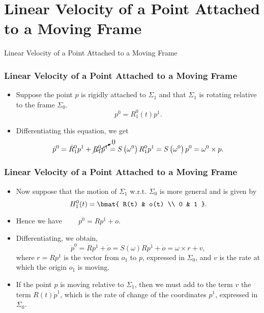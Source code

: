 \section{Linear Velocity of a Point Attached to a Moving Frame}

\begin{frame}
    Linear Velocity of a Point Attached to a Moving Frame


\end{frame}

\begingroup
\small

\begin{frame}
    \frametitle{Linear Velocity of a Point Attached to a Moving Frame}

    \begin{itemize}
        \item Suppose the point $p$ is rigidly attached to $\Sigma_1$ and that 
        $\Sigma_1$ is rotating relative to the frame $\Sigma_0$.
        \[ p^0 = R_1^0(t)p^1. \]
        \item Differentiating this equation, we get 
        \[ \dot{p}^0 = \dot{R}_1^0 p^1 + \cancelto{0}{R_1^0 \dot{p}^1} =
        S\left( \omega^0 \right) R_1^0p^1 = S\left( \omega^0 \right) p^0 =
        \omega^0 \times p. \]
    \end{itemize}
\end{frame}


\begin{frame}
    \frametitle{Linear Velocity of a Point Attached to a Moving Frame}

    \begin{itemize}
        \item Now suppose that the motion of $\Sigma_1$ w.r.t. $\Sigma_0$ is
        more general and is given by \[ H_1^0(t) = \bmat{
            R(t) & o(t) \\ 0 & 1
        }. \]
        \item Hence we have $\qquad p^0 = Rp^1 + o$.
        \item Differentiating, we obtain,
        \[ \dot{p}^0 = \dot{R}p^1 + \dot{o} = S(\omega)Rp^1 + \dot{o} = \omega
        \times r + v, \] where $r = Rp^1$ is the vector from $o_1$ to $p$,
        expressed in $\Sigma_0$, and $v$ is the rate at which the origin $o_1$ 
        is moving.
        \item If the point $p$ is moving relative to $\Sigma_1$, then we must
        add to the term $v$ the term $R(t)\dot{p}^1$, which is the rate of
        change of the coordinates $p^1$, expressed in $\Sigma_0$.
    \end{itemize}
\end{frame}

\endgroup